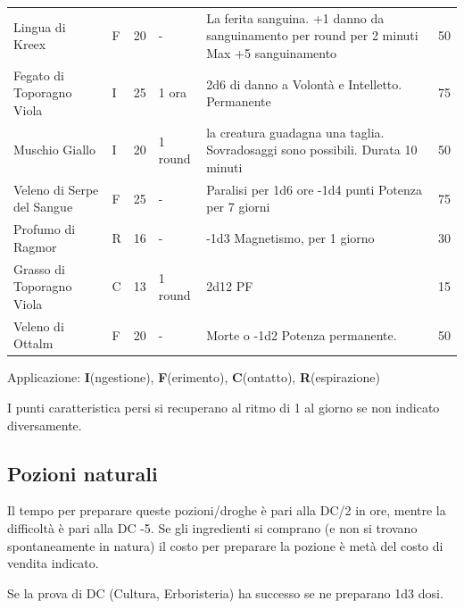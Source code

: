 \documentclass[a4paper,11pt,twoside,openany]{book}
\begin{document}
{\begin{tabular}{L{3.7cm} k{1cm} k{1.5cm} k{1.3cm} k{5.5cm} k{1.5cm}}
Lingua di Kreex  & F & 20 & - & La ferita sanguina. +1 danno da sanguinamento per round per 2 minuti Max +5 sanguinamento & 50 \\
Fegato di Toporagno Viola & I & 25 & 1 ora & 2d6 di danno a Volontà e Intelletto. Permanente & 75\\
Muschio Giallo  & I & 20 & 1 round & la creatura guadagna una taglia. Sovradosaggi sono possibili. Durata 10 minuti & 50\tabularnewline
Veleno di Serpe del Sangue  & F & 25 & - & Paralisi per 1d6 ore -1d4 punti Potenza per 7 giorni & 75\\
Profumo di Ragmor & R & 16 & - & -1d3 Magnetismo, per 1 giorno & 30\tabularnewline
Grasso di Toporagno Viola  & C & 13 & 1 round & 2d12 PF & 15\tabularnewline
Veleno di Ottalm & F & 20 & - & Morte o -1d2 Potenza permanente. & 50\tabularnewline
\end{tabular}



Applicazione: \textbf{I}(ngestione), \textbf{F}(erimento),  \textbf{C}(ontatto), \textbf{R}(espirazione)
\bigskip

I punti caratteristica persi si recuperano al ritmo di 1 al giorno se non indicato diversamente.

\pagebreak

\subsection{Pozioni naturali}

Il tempo per preparare queste pozioni/droghe è pari alla DC/2 in ore, mentre la difficoltà è pari alla DC -5. Se gli ingredienti si comprano (e non si trovano spontaneamente in natura) il costo per preparare la pozione è metà del costo di vendita indicato.

Se la prova di DC (Cultura, Erboristeria) ha successo se ne preparano 1d3 dosi.

\bigskip

}
\end{document}
